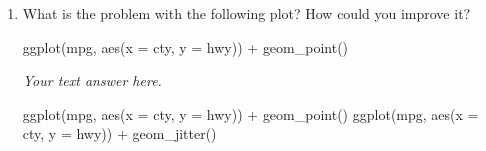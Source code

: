 \documentclass[
  letterpaper,
  DIV=11,
  numbers=noendperiod]{scrreprt}
\newenvironment{Shaded}{\begin{snugshade}}{\end{snugshade}}
\newcommand{\AttributeTok}[1]{\textcolor[rgb]{0.40,0.45,0.13}{#1}}
\newcommand{\FunctionTok}[1]{\textcolor[rgb]{0.28,0.35,0.67}{#1}}
\newcommand{\NormalTok}[1]{\textcolor[rgb]{0.00,0.23,0.31}{#1}}
\newcommand{\SpecialCharTok}[1]{\textcolor[rgb]{0.37,0.37,0.37}{#1}}
\begin{document}
\begin{enumerate}
\begin{figure}
\begin{minipage}[t]{0.50\linewidth}
{  }

  \end{minipage}%
  \newline
  \begin{minipage}[t]{0.50\linewidth}

  {\centering 


  }

  \end{minipage}%
  \begin{minipage}[t]{0.50\linewidth}

  {\centering 


  }

  \end{minipage}%

  \end{figure}
\item
  What is the problem with the following plot? How could you improve it?

\begin{Shaded}
\begin{Highlighting}[]
\FunctionTok{ggplot}\NormalTok{(mpg, }\FunctionTok{aes}\NormalTok{(}\AttributeTok{x =}\NormalTok{ cty, }\AttributeTok{y =}\NormalTok{ hwy)) }\SpecialCharTok{+} 
  \FunctionTok{geom\_point}\NormalTok{()}
\end{Highlighting}
\end{Shaded}

  \begin{tcolorbox}[enhanced jigsaw, breakable, bottomtitle=1mm, left=2mm, colback=white, toprule=.15mm, leftrule=.75mm, colframe=quarto-callout-note-color-frame, colbacktitle=quarto-callout-note-color!10!white, title={Answer}, coltitle=black, toptitle=1mm, bottomrule=.15mm, opacitybacktitle=0.6, arc=.35mm, rightrule=.15mm, titlerule=0mm, opacityback=0]

  \emph{Your text answer here.}

  \end{tcolorbox}

\begin{Shaded}
\begin{Highlighting}[]
\FunctionTok{ggplot}\NormalTok{(mpg, }\FunctionTok{aes}\NormalTok{(}\AttributeTok{x =}\NormalTok{ cty, }\AttributeTok{y =}\NormalTok{ hwy)) }\SpecialCharTok{+} 
  \FunctionTok{geom\_point}\NormalTok{()}
\FunctionTok{ggplot}\NormalTok{(mpg, }\FunctionTok{aes}\NormalTok{(}\AttributeTok{x =}\NormalTok{ cty, }\AttributeTok{y =}\NormalTok{ hwy)) }\SpecialCharTok{+} 
  \FunctionTok{geom\_jitter}\NormalTok{()}
\end{Highlighting}
\end{Shaded}


\end{enumerate}
\end{document}
